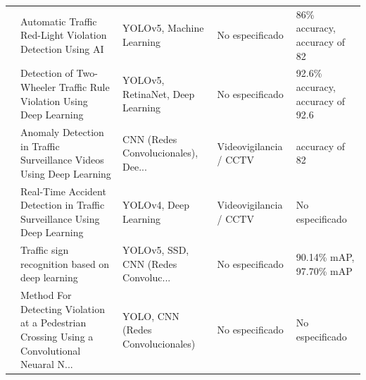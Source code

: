 \begin{table}[htbp]
\begin{tabular}{cp{7.5cm}p{2.8cm}p{2.8cm}p{2.8cm}}
\cite{thao2022automatic} & Automatic Traffic Red-Light Violation Detection Using AI & YOLOv5, Machine Learning & No especificado & 86\% accuracy, accuracy of 82 \\
\cite{arshad2022twowheeler} & Detection of Two-Wheeler Traffic Rule Violation Using Deep Learning & YOLOv5, RetinaNet, Deep Learning & No especificado & 92.6\% accuracy, accuracy of 92.6 \\
\cite{khan2022anomaly} & Anomaly Detection in Traffic Surveillance Videos Using Deep Learning & CNN (Redes Convolucionales), Dee... & Videovigilancia / CCTV & accuracy of 82 \\
\cite{ghahremannezhad2022realtime} & Real-Time Accident Detection in Traffic Surveillance Using Deep Learning & YOLOv4, Deep Learning & Videovigilancia / CCTV & No especificado \\
\cite{zhu2022traffic} & Traffic sign recognition based on deep learning & YOLOv5, SSD, CNN (Redes Convoluc... & No especificado & 90.14\% mAP, 97.70\% mAP \\
\cite{fedosov2021method} & Method For Detecting Violation at a Pedestrian Crossing Using a Convolutional Neuaral N... & YOLO, CNN (Redes Convolucionales) & No especificado & No especificado \\
\bottomrule
\end{tabular}
\end{table}


